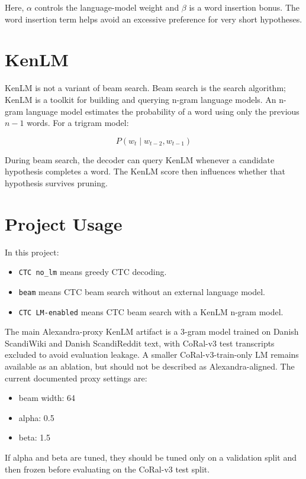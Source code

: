 \documentclass[11pt]{article}
\begin{document}
Here, $\alpha$ controls the language-model weight and $\beta$ is a word
insertion bonus. The word insertion term helps avoid an excessive preference
for very short hypotheses.

\section{KenLM}

KenLM is not a variant of beam search. Beam search is the search algorithm;
KenLM is a toolkit for building and querying n-gram language models. An n-gram
language model estimates the probability of a word using only the previous
$n-1$ words. For a trigram model:

\[
P(w_t \mid w_{t-2}, w_{t-1})
\]

During beam search, the decoder can query KenLM whenever a candidate hypothesis
completes a word. The KenLM score then influences whether that hypothesis
survives pruning.

\section{Project Usage}

In this project:

\begin{itemize}
  \item \texttt{CTC no\_lm} means greedy CTC decoding.
  \item \texttt{beam} means CTC beam search without an external language model.
  \item \texttt{CTC LM-enabled} means CTC beam search with a KenLM n-gram model.
\end{itemize}

The main Alexandra-proxy KenLM artifact is a 3-gram model trained on Danish
ScandiWiki and Danish ScandiReddit text, with CoRal-v3 test transcripts
excluded to avoid evaluation leakage. A smaller CoRal-v3-train-only LM remains
available as an ablation, but should not be described as Alexandra-aligned. The
current documented proxy settings are:

\begin{itemize}
  \item beam width: 64
  \item alpha: 0.5
  \item beta: 1.5
\end{itemize}

If alpha and beta are tuned, they should be tuned only on a validation split and
then frozen before evaluating on the CoRal-v3 test split.



\end{document}
